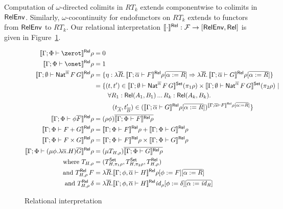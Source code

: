 \documentclass[runningheads]{llncs}
\newcommand{\set}{\mathsf{Set}}
\renewcommand{\id}{\mathit{id}}
\newcommand{\F}{\mathcal{F}}
\renewcommand{\id}{\mathit{id}}
\begin{document}
Computation of $\omega$-directed colimits in $RT_k$ extends
componentwise to colimits in $\mathsf{RelEnv}$. Similarly,
$\omega$-cocontinuity for endofunctors on $RT_k$ extends to
functors from $\mathsf{RelEnv}$ to $RT_k$.
Our relational interpretation $\relsem{\cdot} : \F \to [\relenv,
\rel]$ is given in Figure~\ref{fig:rel-sem}.
\begin{figure}[t]
\begin{adjustbox}{varwidth=5in, max width=5in, fbox, center}
  \begin{align*}
  \relsem{\Gamma;\Phi \vdash \zerot}\rho &= 0\\
  \relsem{\Gamma;\Phi \vdash \onet}\rho &= 1\\
  \relsem{\Gamma; \emptyset \vdash \Nat^{\ol{\alpha}} \,F\,G}\rho &= \{\eta
  : \lambda \ol{R}.\,\relsem{\Gamma; \ol{\alpha} \vdash
    F}\rho[\ol{\alpha := R}] \Rightarrow \lambda \ol{R}. \,\relsem{
    \Gamma; \ol{\alpha} \vdash G}\rho[\ol{\alpha := R}]\}\\
  &=
  \{(t,t') \in \setsem{\Gamma; \emptyset
    \vdash \Nat^{\ol{\alpha}}
    \,F\,G} (\pi_1 \rho) \times \setsem{ 
    \Gamma;\emptyset
    \vdash \Nat^{\ol{\alpha}} \,F\,G} (\pi_2
  \rho)~|~\\ 
  & \hspace{0.3in} \forall {R_1 : \rel(A_1,B_1)}\,...\,{R_k : \rel(A_k,B_k)}.\\
  & \hspace{0.4in} (t_{\ol{A}},t'_{\ol{B}}) \in
  (\relsem{\Gamma; \ol{\alpha} \vdash G}\rho[\ol{\alpha :=
      R}])^{\relsem{\Gamma;\ol{\alpha}\vdash F}\rho[\ol{\alpha := R}]} \}\\  
  \relsem{\Gamma;\Phi \vdash \phi \ol{F}}\rho &=
  (\rho\phi)\ol{\relsem{\Gamma;\Phi \vdash 
    F}\rho}\\
  \relsem{\Gamma;\Phi \vdash F+G}\rho &=
  \relsem{\Gamma;\Phi \vdash F}\rho +
  \relsem{\Gamma;\Phi \vdash G}\rho\\
  \relsem{\Gamma;\Phi \vdash F\times G}\rho &=
  \relsem{\Gamma;\Phi \vdash F}\rho \times
  \relsem{\Gamma;\Phi \vdash G}\rho\\  
   \relsem{\Gamma;\Phi \vdash (\mu \phi.\lambda
    \ol{\alpha}. H)\ol{G}}\rho
  &= (\mu T_{H,\rho})\ol{\relsem{\Gamma;\Phi \vdash
     G}\rho}\\
  \text{where }	T_{H,\rho}
    &= (T^\set_{H,\pi_1\rho}, T^\set_{H,\pi_2\rho}, T^\rel_{H,\rho}) \\
  \text{and } T^\rel_{H,\rho}\,F
    &= \lambda \ol{R}. \relsem{
      \Gamma;\phi,\ol{\alpha} \vdash H}\rho[\phi :=
    F][\ol{\alpha := R}]\\
  \text{and } T^\rel_{H,\rho}\,\delta
    &= \lambda \ol{R}. \relsem{
      \Gamma;\phi,\ol{\alpha} \vdash H}\id_\rho[\phi :=
    \delta][\ol{\alpha := \id_R}]
\end{align*}
\vspace*{-0.3in}\caption{Relational
  interpretation}\label{fig:rel-sem} \vspace*{-0.3in} 
\end{adjustbox}\vspace*{-0.15in}
\end{figure}
\end{document}

